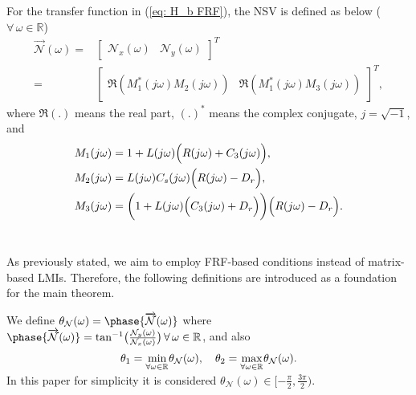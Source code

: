 \begin{definition}
\label{def:NSV}
    For the transfer function in (\ref{eq: H_b FRF}), the NSV is defined as below ($\forall \,\omega \in \mathbb{R}$)
    \begin{equation}
    \begin{split}
    \stackrel{\rightarrow}{\mathcal{N}}(\omega)=&\begin{bmatrix}
        \mathcal{N}_x (\omega) & \mathcal{N}_y (\omega)
    \end{bmatrix}^T \\
    = &\begin{bmatrix}
        \mathfrak{R}(M_1^{*}(j\omega)M_2(j\omega)) & \mathfrak{R}(M_1^{*}(j\omega)M_3(j\omega))
    \end{bmatrix}^T,
    \label{eq.NSV}
    \end{split}
\end{equation}
where $ \mathfrak{R}(.)$ means the real part, $(.)^*$ means the complex conjugate, $j=\sqrt{-1}$, and
\begin{equation}
    \begin{split}
        M_1(j\omega)&=1+L(j\omega)\Bigl(R(j\omega)+C_3(j\omega)\Bigl), \\
        M_2(j\omega)&=L(j\omega)C_s(j\omega)\Big(R(j\omega)-D_r\Big), \\
        M_3(j\omega)&=\bigg(1+L(j\omega)\Big(C_3(j\omega)+D_r\Big)\bigg)\Bigl(R(j\omega)-D_r\Bigl).
    \end{split}
    \label{eq.M}
\end{equation}\\
\end{definition}

As previously stated, we aim to employ FRF-based conditions instead of matrix-based LMIs. Therefore, the following definitions are introduced as a foundation for the main theorem.
\begin{definition}
    \label{def:Types}
     We define $\theta_{\mathcal{N}}(\omega)=\phase{\overrightarrow{\mathcal{N}}(\omega)}$ where $\phase{\overrightarrow{\mathcal{N}}(\omega)}=\mathrm{tan}^{-1}\big({\frac{\mathcal{N}_y (\omega)}{\mathcal{N}_x (\omega)}}\big) \, \forall \,\omega \in \mathbb{R}$, and also
    \begin{equation}
\theta_1=\smash{\displaystyle\min_{\forall\omega \in\mathbb{R}^{}}}\theta_{\mathcal{N}}(\omega),  \quad \theta_2=\smash{\displaystyle\max_{\forall\omega \in\mathbb{R}^{}}}\theta_{\mathcal{N}}(\omega).
\label{eq: teta}
    \end{equation}
    In this paper for simplicity it is considered $\theta_{\mathcal{N}}(\omega)\in [-\frac{\pi}{2},  \frac{3\pi}{2})$.\\
\end{definition}


